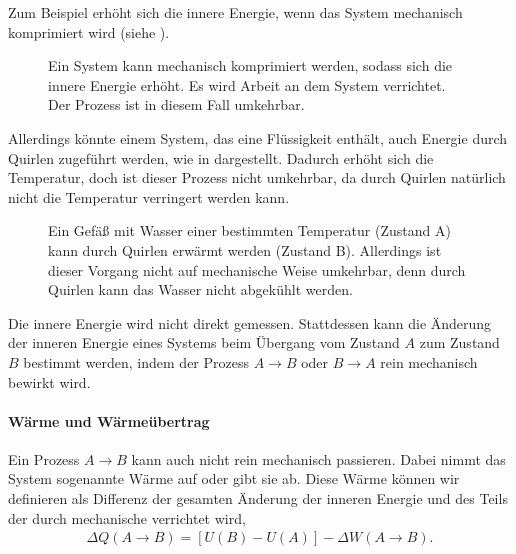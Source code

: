 Zum Beispiel erhöht sich die innere Energie, wenn das System mechanisch komprimiert wird (siehe ).

\begin{figure}[htbp]
    \centering
    \tfigRectangularBoxWithPiston
    \caption{Ein System kann mechanisch komprimiert werden, sodass sich die innere Energie erhöht. Es wird Arbeit an dem System verrichtet. Der Prozess ist in diesem Fall umkehrbar. }
    \label{fig:RectangularBoxWithPiston}
\end{figure}

Allerdings könnte einem System, das eine Flüssigkeit enthält, auch Energie durch Quirlen zugeführt werden, wie in  dargestellt. Dadurch erhöht sich die Temperatur, doch ist dieser Prozess nicht umkehrbar, da durch Quirlen natürlich nicht die Temperatur verringert werden kann.

\begin{figure}[htbp]
    \centering
    \tfigWaterStiringIceCubes
    \caption{Ein Gefäß mit Wasser einer bestimmten Temperatur (Zustand A) kann durch Quirlen erwärmt werden (Zustand B). Allerdings ist dieser Vorgang nicht auf mechanische Weise umkehrbar, denn durch Quirlen kann das Wasser nicht abgekühlt werden. }
    \label{fig:WaterStiringIceCubes}
\end{figure}

\begin{formal}
    Die innere Energie wird nicht direkt gemessen. Stattdessen kann die Änderung der inneren Energie eines Systems beim Übergang vom Zustand $A$ zum Zustand $B$ bestimmt werden, indem der Prozess $A\rightarrow B$ oder $B\rightarrow A$ rein mechanisch bewirkt wird.
\end{formal}



\paragraph*{Wärme und Wärmeübertrag}

Ein Prozess $A\rightarrow B$ kann auch nicht rein mechanisch passieren. Dabei nimmt das System sogenannte Wärme auf oder gibt sie ab. Diese Wärme können wir definieren als Differenz der gesamten Änderung der inneren Energie und des Teils der durch mechanische verrichtet wird,
\begin{align*}
    \Delta Q(A\rightarrow B) = [U(B)-U(A)] - \Delta W(A\rightarrow B).
\end{align*}

